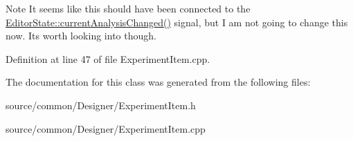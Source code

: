 \begin{DoxyNote}{Note}
It seems like this should have been connected to the \hyperlink{class_editor_state_a50e0836cdfe1d8272171575b2f33a918}{Editor\-State\-::current\-Analysis\-Changed()} signal, but I am not going to change this now. Its worth looking into though. 
\end{DoxyNote}


Definition at line 47 of file Experiment\-Item.\-cpp.



The documentation for this class was generated from the following files\-:\begin{DoxyCompactItemize}
\item 
source/common/\-Designer/Experiment\-Item.\-h\item 
source/common/\-Designer/Experiment\-Item.\-cpp\end{DoxyCompactItemize}
